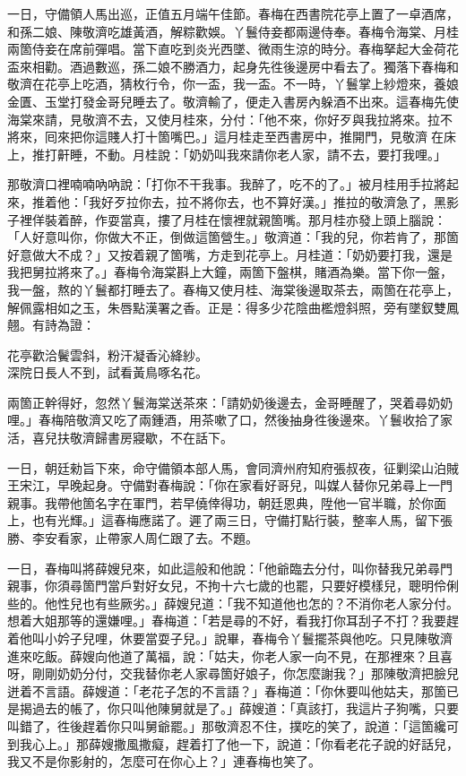 一日，守備領人馬出巡，正值五月端午佳節。春梅在西書院花亭上置了一卓酒席，和孫二娘、陳敬濟吃雄黃酒，解粽歡娛。{}丫鬟侍妾都兩邊侍奉。春梅令海棠、月桂兩箇侍妾在席前彈唱。當下直吃到炎光西墜、微雨生涼的時分。春梅拏起大金荷花盃來相勸。酒過數巡，孫二娘不勝酒力，起身先徃後邊房中看去了。獨落下春梅和敬濟在花亭上吃酒，猜枚行令，你一盃，我一盃。不一時，丫鬟掌上紗燈來，養娘金匱、玉堂打發金哥兒睡去了。敬濟輸了，便走入書房內躲酒不出來。這春梅先使海棠來請，見敬濟不去，又使月桂來，分付：「他不來，你好歹與我拉將來。拉不將來，囘來把你這賤人打十箇嘴巴。」這月桂走至西書房中，推開門，見敬濟𢱉在床上，推打鼾睡，不動。月桂說：「奶奶叫我來請你老人家，請不去，要打我哩。」

那敬濟口裡喃喃吶吶說：「打你不干我事。{}我醉了，吃不的了。」被月桂用手拉將起來，推着他：「我好歹拉你去，拉不將你去，也不算好漢。」推拉的敬濟急了，黑影子裡佯裝着醉，作耍當真，摟了月桂在懷裡就親箇嘴。那月桂亦發上頭上腦說：「人好意叫你，你做大不正，倒做這箇營生。」敬濟道：「我的兒，你若肯了，那箇好意做大不成？」又按着親了箇嘴，方走到花亭上。月桂道：「奶奶要打我，還是我把舅拉將來了。」春梅令海棠斟上大鐘，兩箇下盤棋，賭酒為樂。當下你一盤，我一盤，熬的丫鬟都打睡去了。春梅又使月桂、海棠後邊取茶去，兩箇在花亭上，解佩露相如之玉，朱唇點漢署之香。正是：得多少花陰曲檻燈斜照，旁有墜釵雙鳳翹。有詩為證：

\begin{myquote}
花亭歡洽鬢雲斜，粉汗凝香沁絳紗。\\深院日長人不到，試看黃鳥啄名花。
\end{myquote}

兩箇正幹得好，忽然丫鬟海棠送茶來：「請奶奶後邊去，金哥睡醒了，哭着尋奶奶哩。」春梅陪敬濟又吃了兩鍾酒，用茶嗽了口，然後抽身徃後邊來。丫鬟收拾了家活，喜兒扶敬濟歸書房寢歇，不在話下。

一日，朝廷勑旨下來，命守備領本部人馬，會同濟州府知府張叔夜，征剿梁山泊賊王宋江，早晚起身。守備對春梅說：「你在家看好哥兒，叫媒人替你兄弟尋上一門親事。我帶他箇名字在軍門，若早僥倖得功，朝廷恩典，陞他一官半職，於你面上，也有光輝。」{}這春梅應諾了。遲了兩三日，守備打點行裝，整率人馬，留下張勝、李安看家，止帶家人周仁跟了去。不題。

一日，春梅叫將薛嫂兒來，如此這般和他說：「他爺臨去分付，叫你替我兄弟尋門親事，你須尋箇門當戶對好女兒，不拘十六七歲的也罷，只要好模樣兒，聰明伶俐些的。他性兒也有些厥劣。」薛嫂兒道：「我不知道他也怎的？不消你老人家分付。想着大姐那等的還嫌哩。」春梅道：「若是尋的不好，看我打你耳刮子不打？我要趕着他叫小妗子兒哩，休要當耍子兒。」說畢，春梅令丫鬟擺茶與他吃。只見陳敬濟進來吃飯。薛嫂向他道了萬福，說：「姑夫，你老人家一向不見，在那裡來？且喜呀，剛剛奶奶分付，交我替你老人家尋箇好娘子，你怎麼謝我？」那陳敬濟把臉兒迸着不言語。{}薛嫂道：「老花子怎的不言語？」春梅道：「你休要叫他姑夫，那箇已是揭過去的帳了，你只叫他陳舅就是了。」薛嫂道：「真該打，我這片子狗嘴，只要叫錯了，徃後趕着你只叫舅爺罷。」那敬濟忍不住，撲吃的笑了，說道：「這箇纔可到我心上。」{}那薛嫂撒風撒癡，趕着打了他一下，說道：「你看老花子說的好話兒，我又不是你影射的，怎麼可在你心上？」連春梅也笑了。

